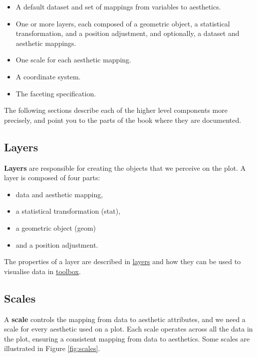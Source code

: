 \begin{itemize}
\itemsep1pt\parskip0pt
\item
  A default dataset and set of mappings from variables to aesthetics.
\item
  One or more layers, each composed of a geometric object, a statistical
  transformation, and a position adjustment, and optionally, a dataset
  and aesthetic mappings.
\item
  One scale for each aesthetic mapping.
\item
  A coordinate system.
\item
  The faceting specification.
\end{itemize}

The following sections describe each of the higher level components more
precisely, and point you to the parts of the book where they are
documented.

\subsection{Layers}

\textbf{Layers} are responsible for creating the objects that we
perceive on the plot. A layer is composed of four parts:

\begin{itemize}
\itemsep1pt\parskip0pt
\item
  data and aesthetic mapping,
\item
  a statistical transformation (stat),
\item
  a geometric object (geom)
\item
  and a position adjustment.
\end{itemize}

The properties of a layer are described in \hyperref[cha:layers]{layers}
and how they can be used to visualise data in
\hyperref[cha:toolbox]{toolbox}.

\subsection{Scales}\label{sub:scales}

A \textbf{scale} controls the mapping from data to aesthetic attributes,
and we need a scale for every aesthetic used on a plot. Each scale
operates across all the data in the plot, ensuring a consistent mapping
from data to aesthetics. Some scales are illustrated in Figure
\ref{fig:scales}.

